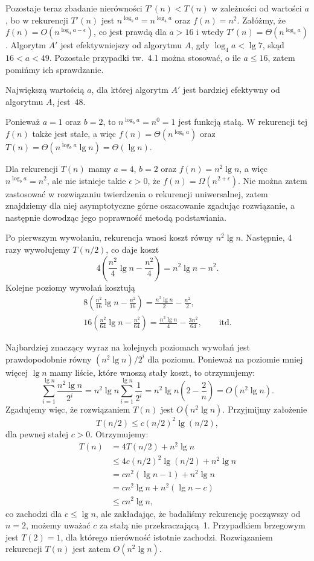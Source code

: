 Pozostaje teraz zbadanie nierówności $T'(n)<T(n)$ w zależności od wartości $a$, bo w rekurencji $T'(n)$ jest $n^{\log_ba}=n^{\log_4a}$ oraz $f(n)=n^2$. Załóżmy, że $f(n)=O(n^{\log_4a-\epsilon})$, co jest prawdą dla $a>16$ i wtedy $T'(n)=\Theta(n^{\log_4a})$. Algorytm $A'$ jest efektywniejszy od algorytmu $A$, gdy $\log_4a<\lg7$, skąd $16<a<49$. Pozostałe przypadki tw.~4.1 można stosować, o ile $a\le16$, zatem pomińmy ich sprawdzanie.

Największą wartością $a$, dla której algorytm $A'$ jest bardziej efektywny od algorytmu $A$, jest~$48$.

\exercise{} %
Ponieważ $a=1$ oraz $b=2$, to $n^{\log_ba}=n^0=1$ jest funkcją stałą. W rekurencji tej $f(n)$ także jest stałe, a więc $f(n)=\Theta(n^{\log_ba})$ oraz $T(n)=\Theta(n^{\log_ba}\lg n)=\Theta(\lg n)$.

\exercise{} %
Dla rekurencji $T(n)$ mamy $a=4$, $b=2$ oraz $f(n)=n^2\lg n$, a więc $n^{\log_ba}=n^2$, ale nie istnieje takie $\epsilon>0$, że $f(n)=\Omega(n^{2+\epsilon})$. Nie można zatem zastosować w rozwiązaniu twierdzenia o rekurencji uniwersalnej, zatem znajdziemy dla niej asymptotyczne górne oszacowanie zgadując rozwiązanie, a następnie dowodząc jego poprawność metodą podstawiania.

Po pierwszym wywołaniu, rekurencja wnosi koszt równy $n^2\lg n$. Następnie, 4 razy wywołujemy $T(n/2)$, co daje koszt
\[
	4\left(\frac{n^2}{4}\lg n-\frac{n^2}{4}\right) = n^2\lg n-n^2.
\]
Kolejne poziomy wywołań kosztują
\begin{gather*}
	8\left(\frac{n^2}{16}\lg n-\frac{n^2}{16}\right) = \frac{n^2\lg n}{2}-\frac{n^2}{2}, \qquad\phantom{itd.} \\
	16\left(\frac{n^2}{64}\lg n-\frac{n^2}{64}\right) = \frac{n^2\lg n}{4}-\frac{3n^2}{64}, \qquad\text{itd.}
\end{gather*}

Najbardziej znaczący wyraz na kolejnych poziomach wywołań jest prawdopodobnie równy $(n^2\lg n)/2^i$ dla  poziomu. Ponieważ na poziomie mniej więcej $\lg n$ mamy liście, które wnoszą stały koszt, to otrzymujemy:
\[
	\sum_{i=1}^{\lg n}\frac{n^2\lg n}{2^i} = n^2\lg n\sum_{i=1}^{\lg n}\frac{1}{2^i} = n^2\lg n\left(2-\frac{2}{n}\right) = O(n^2\lg n).
\]
Zgadujemy więc, że rozwiązaniem $T(n)$ jest $O(n^2\lg n)$. Przyjmijmy założenie
\[
	T(n/2) \le c(n/2)^2\lg(n/2),
\]
dla pewnej stałej $c>0$. Otrzymujemy:
\begin{align*}
	T(n) &= 4T(n/2)+n^2\lg n \\
	&\le 4c(n/2)^2\lg(n/2)+n^2\lg n \\
	&= cn^2(\lg n-1)+n^2\lg n \\
	&= cn^2\lg n+n^2(\lg n-c) \\
	&\le cn^2\lg n,
\end{align*}
co zachodzi dla $c\le\lg n$, ale zakładając, że badaliśmy rekurencję począwszy od $n=2$, możemy uważać $c$ za stałą nie przekraczającą~1. Przypadkiem brzegowym jest $T(2)=1$, dla którego nierówność istotnie zachodzi. Rozwiązaniem rekurencji $T(n)$ jest zatem $O(n^2\lg n)$.

